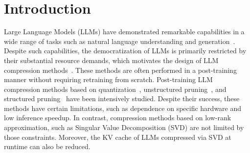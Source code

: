 \section{Introduction}
\label{sec:introduction}
\vspace{-3mm}
Large Language Models (LLMs) have demonstrated remarkable capabilities in a wide range of tasks such as natural language understanding and generation~\citep{DBLP:journals/corr/abs-2303-18223, DBLP:journals/corr/abs-2306-02781}. 
%
Despite such capabilities, the democratization of LLMs is primarily restricted by their substantial resource demands, which motivates the design of LLM compression methods~\citep{DBLP:journals/tmlr/Wan0LA0LQYZZC024, DBLP:journals/corr/abs-2401-01923, DBLP:journals/tacl/ZhuLLMW24, DBLP:journals/corr/abs-2404-14294}.
These methods are often performed in a post-training manner without requiring retraining from scratch.
%
Post-training LLM compression methods based on quantization~\citep{DBLP:conf/iclr/YuanSD24, DBLP:conf/icml/HuangLQLZ0M024}, unstructured pruning~\citep{DBLP:conf/icml/FrantarA23}, and structured pruning~\citep{DBLP:conf/nips/MaFW23, DBLP:conf/iclr/AshkboosCNHH24, DBLP:journals/corr/abs-2406-10594} have been intensively studied. 
%
Despite their success, these methods have certain limitations, such as dependence on specific hardware and low inference speedup. In contrast, compression methods based on low-rank approximation, such as Singular Value Decomposition (SVD) are not limited by those constraints. Moreover, the KV cache of LLMs compressed via SVD at runtime can also be reduced.

